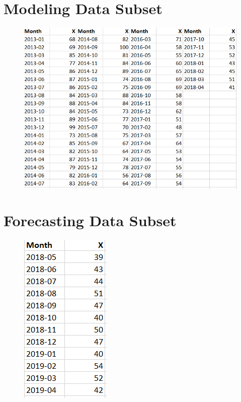 \documentclass[12pt]{article}
\begin{document}
\newpage
\begin{appendices}	
	\section{Modeling Data Subset}
	
	\begin{figure}[h!]
		\includegraphics[scale=1.1]{Data_Table_Model.PNG}
	\end{figure}

\newpage

	\section{Forecasting Data Subset}

\begin{figure}[h!]
	\includegraphics[scale=1.1]{Data_Table_Forecast.PNG}
\end{figure}

\end{appendices}
\end{document}
